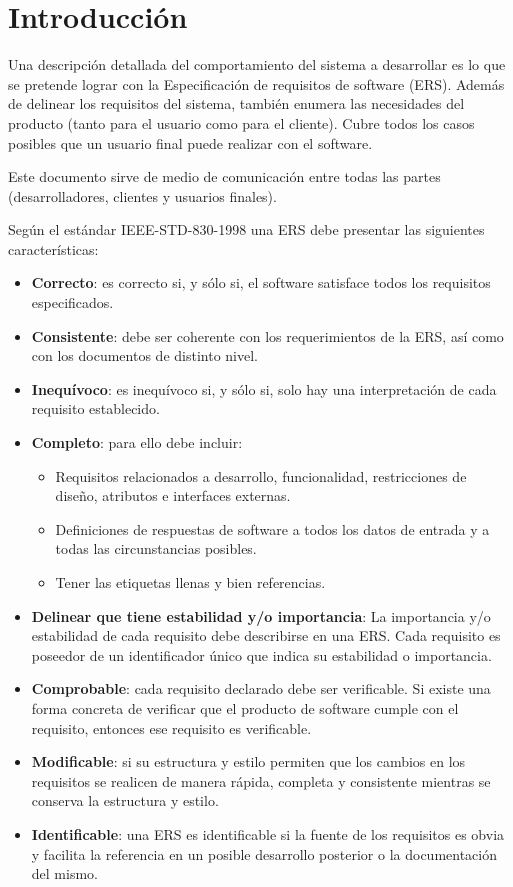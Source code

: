 
\section{Introducción}

Una descripción detallada del comportamiento del sistema a desarrollar es lo que se pretende lograr con la Especificación de requisitos de software (ERS). Además de delinear los requisitos del sistema, también enumera las necesidades del producto (tanto para el usuario como para el cliente).
Cubre todos los casos posibles que un usuario final puede realizar con el software.

Este documento sirve de medio de comunicación entre todas las partes (desarrolladores, clientes y usuarios finales).

Según el estándar IEEE-STD-830-1998 \cite{ieee830} una ERS debe presentar las siguientes características:

\begin{itemize}
    \item \textbf{Correcto}: es correcto si, y sólo si, el software satisface todos los requisitos especificados.
    \item \textbf{Consistente}: debe ser coherente con los requerimientos de la ERS, así como con los documentos de distinto nivel.
    \item \textbf{Inequívoco}: es inequívoco si, y sólo si, solo hay una interpretación de cada requisito establecido.
    \item \textbf{Completo}: para ello debe incluir: 
        \begin{itemize}
            \item Requisitos relacionados a desarrollo, funcionalidad, restricciones de diseño, atributos e interfaces externas.
            \item Definiciones de respuestas de software a todos los datos de entrada y a todas las circunstancias posibles.
            \item Tener las etiquetas llenas y bien referencias. 
        \end{itemize}
    \item \textbf{Delinear que tiene estabilidad y/o importancia}: La importancia y/o estabilidad de cada requisito debe describirse en una ERS. Cada requisito es poseedor de un identificador único que indica su estabilidad o importancia.
    \item \textbf{Comprobable}: cada requisito declarado debe ser verificable. Si existe una forma concreta de verificar que el producto de software cumple con el requisito, entonces ese requisito es verificable.
    \item \textbf{Modificable}: si su estructura y estilo permiten que los cambios en los requisitos se realicen de manera rápida, completa y consistente mientras se conserva la estructura y estilo.
    \item \textbf{Identificable}: una ERS es identificable si la fuente de los requisitos es obvia y facilita la referencia en un posible desarrollo posterior o la documentación del mismo.
\end{itemize}


